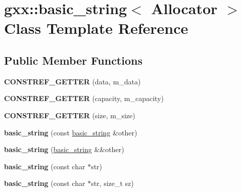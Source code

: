 \hypertarget{classgxx_1_1basic__string}{}\section{gxx\+:\+:basic\+\_\+string$<$ Allocator $>$ Class Template Reference}
\label{classgxx_1_1basic__string}
\subsection*{Public Member Functions}
\begin{DoxyCompactItemize}
\item 
{\bfseries C\+O\+N\+S\+T\+R\+E\+F\+\_\+\+G\+E\+T\+T\+ER} (data, m\+\_\+data)\hypertarget{classgxx_1_1basic__string_a25a7518772b232e74b483d4e1667f689}{}\label{classgxx_1_1basic__string_a25a7518772b232e74b483d4e1667f689}

\item 
{\bfseries C\+O\+N\+S\+T\+R\+E\+F\+\_\+\+G\+E\+T\+T\+ER} (capacity, m\+\_\+capacity)\hypertarget{classgxx_1_1basic__string_a5e2120a19527fe9e506415f72faf3b61}{}\label{classgxx_1_1basic__string_a5e2120a19527fe9e506415f72faf3b61}

\item 
{\bfseries C\+O\+N\+S\+T\+R\+E\+F\+\_\+\+G\+E\+T\+T\+ER} (size, m\+\_\+size)\hypertarget{classgxx_1_1basic__string_a50d12d0faae89c00ed26cc51508b6a2b}{}\label{classgxx_1_1basic__string_a50d12d0faae89c00ed26cc51508b6a2b}

\item 
{\bfseries basic\+\_\+string} (const \hyperlink{classgxx_1_1basic__string}{basic\+\_\+string} \&other)\hypertarget{classgxx_1_1basic__string_a7995ab02a7a368afa030f863f2894c84}{}\label{classgxx_1_1basic__string_a7995ab02a7a368afa030f863f2894c84}

\item 
{\bfseries basic\+\_\+string} (\hyperlink{classgxx_1_1basic__string}{basic\+\_\+string} \&\&other)\hypertarget{classgxx_1_1basic__string_a6e1ecf6134e1e98107321c6b25a70aa3}{}\label{classgxx_1_1basic__string_a6e1ecf6134e1e98107321c6b25a70aa3}

\item 
{\bfseries basic\+\_\+string} (const char $\ast$str)\hypertarget{classgxx_1_1basic__string_a0632c1a00f88abd0326b0248537338aa}{}\label{classgxx_1_1basic__string_a0632c1a00f88abd0326b0248537338aa}

\item 
{\bfseries basic\+\_\+string} (const char $\ast$str, size\+\_\+t sz)\hypertarget{classgxx_1_1basic__string_a85e176434218cd67ebc6686ddfc4f5c2}{}\label{classgxx_1_1basic__string_a85e176434218cd67ebc6686ddfc4f5c2}


\end{DoxyCompactItemize}
